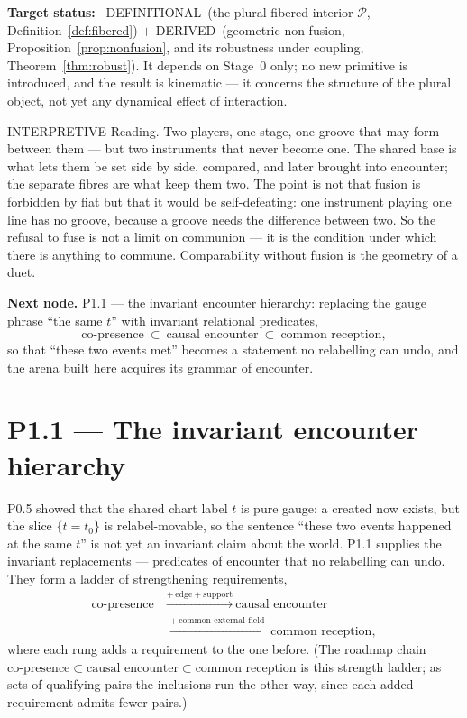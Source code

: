 \documentclass[11pt,a4paper]{article}
\def\emph#1{#1}%
\newcommand{\stDerived}{\textcolor{cDer}{\textsf{\small DERIVED}}}
\newcommand{\stDef}{\textcolor{cDef}{\textsf{\small DEFINITIONAL}}}
\newcommand{\stInterp}{\textcolor{cInt}{\textsf{\small INTERPRETIVE}}}
\theoremstyle{definition}
\theoremstyle{plain}
\theoremstyle{remark}
\begin{document}
\textbf{Target status:}~
\stDef\ (the plural fibered interior \(\mathcal P\), Definition~\ref{def:fibered})
\(+\)
\stDerived\ (geometric non-fusion, Proposition~\ref{prop:nonfusion}, and its robustness
under coupling, Theorem~\ref{thm:robust}). It depends on Stage~0 only; no new primitive is
introduced, and the result is kinematic --- it concerns the structure of the plural
object, not yet any dynamical effect of interaction.

\medskip
\stInterp\quad
\emph{Reading.}
Two players, one stage, one groove that may form between them --- but two instruments that
never become one. The shared base is what lets them be set side by side, compared, and
later brought into encounter; the separate fibres are what keep them two. The point is not
that fusion is forbidden by fiat but that it would be self-defeating: one instrument
playing one line has no groove, because a groove needs the difference between two. So the
refusal to fuse is not a limit on communion --- it is the condition under which there is
anything to commune. Comparability without fusion is the geometry of a duet.

\medskip
\textbf{Next node.} P1.1 --- the invariant encounter hierarchy: replacing the gauge phrase
``the same \(t\)'' with invariant relational predicates,
\[
\text{co-presence}\ \subset\ \text{causal encounter}\ \subset\ \text{common reception},
\]
so that ``these two events met'' becomes a statement no relabelling can undo, and the
arena built here acquires its grammar of encounter.

\section{P1.1 --- The invariant encounter hierarchy}

P0.5 showed that the shared chart label \(t\) is pure gauge: a created now exists, but the
slice \(\{t=t_0\}\) is relabel-movable, so the sentence ``these two events happened at the
same \(t\)'' is not yet an invariant claim about the world. P1.1 supplies the invariant
replacements --- predicates of encounter that no relabelling can undo. They form a ladder
of strengthening requirements,
\[
\begin{aligned}
\text{co-presence}
&\ \xrightarrow{+\,\text{edge}+\text{support}}\
\text{causal encounter}\\
&\ \xrightarrow{+\,\text{common external field}}\
\text{common reception},
\end{aligned}
\]
where each rung adds a requirement to the one before. (The roadmap chain
\(\text{co-presence}\subset\text{causal encounter}\subset\text{common reception}\) is this
strength ladder; as \emph{sets of qualifying pairs} the inclusions run the other way, since
each added requirement admits fewer pairs.)
\end{document}
